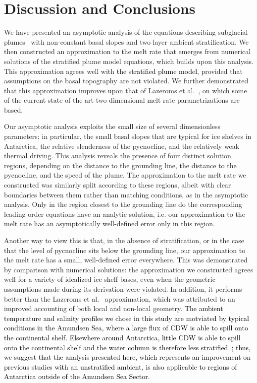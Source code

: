 \documentclass[openacc]{rsproca_new}%
\newcommand{\red}[1]{{\color{red} #1}}
\newcommand{\blue}[1]{{\color{blue} #1}}
\newcommand{\rout}[1]{\red{\st{#1}}}\newcommand{\ab}[1]{\textcolor{Green}{#1}}\newcommand{\about}[1]{\textcolor{Cyan}{\sout{#1}}}
\renewcommand{\rout}[1]{{}} %
\renewcommand{\blue}[1]{{\textcolor{black}{#1}}} %
\renewcommand{\red}[1]{{}} %
\begin{document}
\section{Discussion and Conclusions}\label{S:Discussion}
We have presented an asymptotic analysis of the equations describing subglacial plumes~\cite{Jenkins1991JGeophysResOceans, Jenkins2011JPhysOcean} with non-constant basal slopes and two layer ambient stratification. We then constructed an approximation to the melt rate that emerges from numerical solutions of the stratified plume model equations, which builds upon this analysis. This approximation agrees well with \blue{the stratified plume model}\rout{numerical solutions}, provided that assumptions on the basal topography are not violated. We further demonstrated that this approximation improves upon that of Lazeroms et al.~\cite{Lazeroms2019JPhysOcean}, on which some of the current state of the art two-dimensional melt rate parametrizations are based.

Our asymptotic analysis exploits the small size of several dimensionless parameters; in particular, the small basal slopes that are typical for ice shelves in Antarctica, the relative slenderness of the pycnocline, and the relatively weak thermal driving. This analysis reveals the presence of four distinct solution regions, depending on the distance to the grounding line, the distance to the pycnocline, and the speed of the plume. The approximation to the melt rate we constructed was similarly split according to these regions, albeit with clear boundaries between them rather than matching conditions, as in the asymptotic analysis. Only in the region closest to the grounding line do the corresponding leading order equations have an analytic solution, i.e. our approximation to the melt rate has an asymptotically well-defined error only in this region. 

Another way to view this is that, in the absence of stratification, or in the case that the level of pycnocline sits below the grounding line, our approximation to the melt rate has a small, well-defined error everywhere. This was demonstrated by comparison with numerical solutions: the approximation we constructed agrees well for a variety of idealized ice shelf bases, even when the geometric assumptions made during its derivation were violated. In addition, it performs better than the Lazeroms et al.~\cite{Lazeroms2019JPhysOcean} approximation, which was attributed to an improved accounting of both local and non-local geometry. \blue{The ambient temperature and salinity profiles we chose in this study are motviated by typical conditions in the Amundsen Sea, where a large flux of CDW is able to spill onto the continental shelf. Elsewhere around Antarctica, little CDW is able to spill onto the continental shelf and the water column is therefore less stratified~\cite{Petty2013JPO}; thus, we suggest that the analysis presented here, which represents an improvement on previous studies with an unstratified ambient, is also applicable to regions of Antarctica outside of the Amundsen Sea Sector.}
\end{document}
